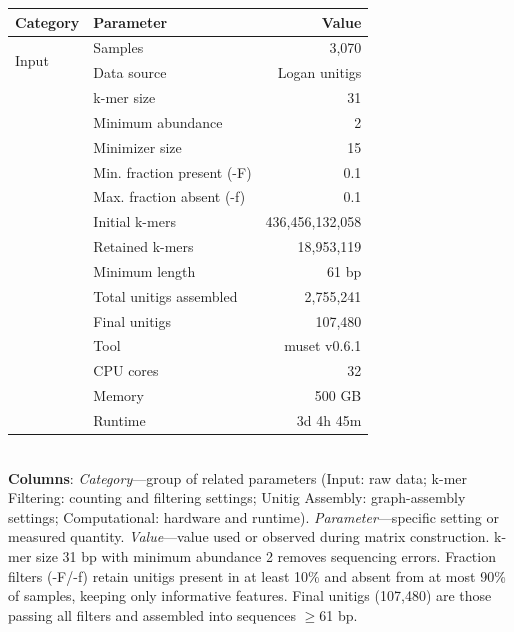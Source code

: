 \centering
\caption{Parameters and computational resources used to build the unitig feature matrix with muset\label{tab:matrix_generation}}
\begin{tabular*}{\columnwidth}{@{\extracolsep{\fill}}llr@{\extracolsep{\fill}}}
\toprule
Category & Parameter & Value \\
\midrule
\multirow{2}{*}{Input} & Samples & 3,070 \\
 & Data source & Logan unitigs \\
\addlinespace
\multirow{7}{*}{k-mer Filtering} & k-mer size & 31 \\
 & Minimum abundance & 2 \\
 & Minimizer size & 15 \\
 & Min. fraction present (-F) & 0.1 \\
 & Max. fraction absent (-f) & 0.1 \\
 & Initial k-mers & 436,456,132,058 \\
 & Retained k-mers & 18,953,119 \\
\addlinespace
\multirow{3}{*}{Unitig Assembly} & Minimum length & 61 bp \\
 & Total unitigs assembled & 2,755,241 \\
 & Final unitigs & 107,480 \\
\addlinespace
\multirow{4}{*}{Computational} & Tool & muset v0.6.1 \\
 & CPU cores & 32 \\
 & Memory & 500 GB \\
 & Runtime & 3d 4h 45m \\
\bottomrule
\end{tabular*}
\\[2mm]
{\footnotesize \textbf{Columns}: \textit{Category}---group of related parameters (Input: raw data; k-mer Filtering: counting and filtering settings; Unitig Assembly: graph-assembly settings; Computational: hardware and runtime). \textit{Parameter}---specific setting or measured quantity. \textit{Value}---value used or observed during matrix construction. k-mer size 31 bp with minimum abundance 2 removes sequencing errors. Fraction filters ({-F}/{-f}) retain unitigs present in at least 10\% and absent from at most 90\% of samples, keeping only informative features. Final unitigs (107,480) are those passing all filters and assembled into sequences $\geq$61 bp.}
